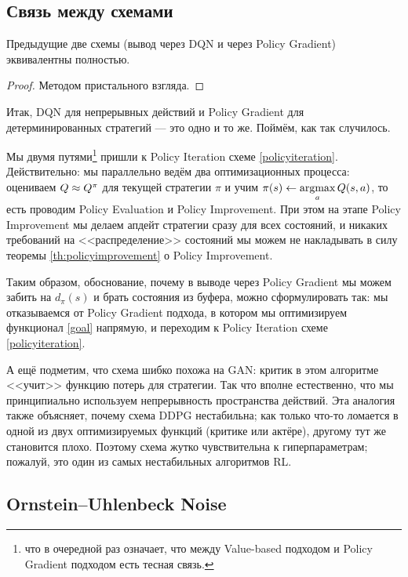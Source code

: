 \subsection{Связь между схемами}

\begin{theorem}
Предыдущие две схемы (вывод через DQN и через Policy Gradient) эквивалентны полностью.
\begin{proof}
Методом пристального взгляда.
\end{proof}
\end{theorem}

Итак, DQN для непрерывных действий и Policy Gradient для детерминированных стратегий --- это одно и то же. Поймём, как так случилось.

Мы двумя путями\footnote{что в очередной раз означает, что между Value-based подходом и Policy Gradient подходом есть тесная связь.} пришли к Policy Iteration схеме \ref{policyiteration}. Действительно: мы параллельно ведём два оптимизационных процесса: оцениваем $Q \HM \approx Q^\pi$ для текущей стратегии $\pi$ и учим $\pi(s) \leftarrow \mathop{\mathrm{argmax}}\limits_a Q(s, a)$, то есть проводим Policy Evaluation и Policy Improvement. При этом на этапе Policy Improvement мы делаем апдейт стратегии сразу для всех состояний, и никаких требований на <<распределение>> состояний мы можем не накладывать в силу теоремы \ref{th:policyimprovement} о Policy Improvement. 

Таким образом, обоснование, почему в выводе через Policy Gradient мы можем забить на $d_\pi(s)$ и брать состояния из буфера, можно сформулировать так: мы отказываемся от Policy Gradient подхода, в котором мы оптимизируем функционал \eqref{goal} напрямую, и переходим к Policy Iteration схеме \ref{policyiteration}.

\begin{remark}
А ещё подметим, что схема шибко похожа на GAN: критик в этом алгоритме <<учит>> функцию потерь для стратегии. Так что вполне естественно, что мы принципиально используем непрерывность пространства действий. Эта аналогия также объясняет, почему схема DDPG нестабильна; как только что-то ломается в одной из двух оптимизируемых функций (критике или актёре), другому тут же становится плохо. Поэтому схема жутко чувствительна к гиперпараметрам; пожалуй, это один из самых нестабильных алгоритмов RL.
\end{remark}

\subsection{Ornstein--Uhlenbeck Noise}

